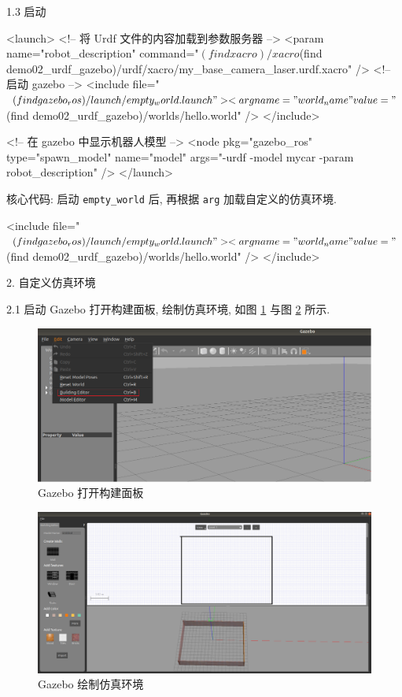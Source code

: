 \documentclass[openany, fontset=windowsold]{ctexbook}
\theoremstyle{kaiti}
\theoremstyle{normal}
\begin{document}
1.3 启动

\begin{xml}
  <launch>
      <!-- 将 Urdf 文件的内容加载到参数服务器 -->
      <param name="robot_description" command="$(find xacro)/xacro $(find demo02_urdf_gazebo)/urdf/xacro/my_base_camera_laser.urdf.xacro" />
      <!-- 启动 gazebo -->
      <include file="$(find gazebo_ros)/launch/empty_world.launch">
          <arg name="world_name" value="$(find demo02_urdf_gazebo)/worlds/hello.world" />
      </include>

      <!-- 在 gazebo 中显示机器人模型 -->
      <node pkg="gazebo_ros" type="spawn_model" name="model" args="-urdf -model mycar -param robot_description"  />
  </launch>
\end{xml}

核心代码: 启动 \verb|empty_world| 后, 再根据 \verb|arg| 加载自定义的仿真环境.

\begin{xml}
  <include file="$(find gazebo_ros)/launch/empty_world.launch">
      <arg name="world_name" value="$(find demo02_urdf_gazebo)/worlds/hello.world" />
  </include>
\end{xml}

2. 自定义仿真环境

2.1 启动 Gazebo 打开构建面板, 绘制仿真环境, 如图 \ref{fig:gazebo_build_world} 与图 \ref{fig:gazebo_build_manully} 所示.

\begin{figure}[!ht]
  \centering
  \includegraphics[width=.9\textwidth]{gazebo_build_world.png}
  \caption{Gazebo 打开构建面板}
  \label{fig:gazebo_build_world}
\end{figure}

\begin{figure}[!ht]
  \centering
  \includegraphics[width=.9\textwidth]{gazebo_build_manully.png}
  \caption{Gazebo 绘制仿真环境}
  \label{fig:gazebo_build_manully}
\end{figure}
\end{document}
